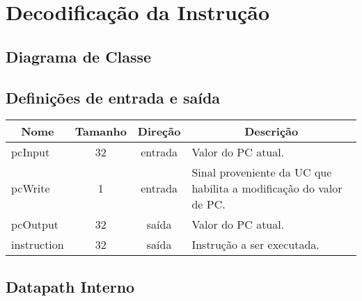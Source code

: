 \section{Decodificação da Instrução}
	\subsection{Diagrama de Classe}
  \begin{figure}[H]
    
  \end{figure}
		
		\subsection{Definições de entrada e saída}
		
	\begin{center}
		\begin{longtable}[pos]{| l | c | c | m{7cm} |} \hline
			\multicolumn{1}{|c|}{\cellcolor[gray]{0.9}\textbf{Nome}} & 
			\multicolumn{1}{c|}{\cellcolor[gray]{0.9}\textbf{Tamanho}} & 
			\multicolumn{1}{c|}{\cellcolor[gray]{0.9}\textbf{Direção}} &
			\multicolumn{1}{c|}{\cellcolor[gray]{0.9}\textbf{Descrição}} \\ \hline
			\endhead
			\hline
			\endlastfoot
			
			pcInput & 32 & entrada & Valor do PC atual.\\ \hline
			pcWrite & 1 & entrada & Sinal proveniente da UC que habilita a modificação do valor de PC. \\ \hline
			pcOutput & 32 & saída & Valor do PC atual. \\ \hline
			instruction & 32 & saída & Instrução a ser executada. \\ \hline
			
		\end{longtable}
	\end{center}
	
	\subsection{Datapath Interno}
	

